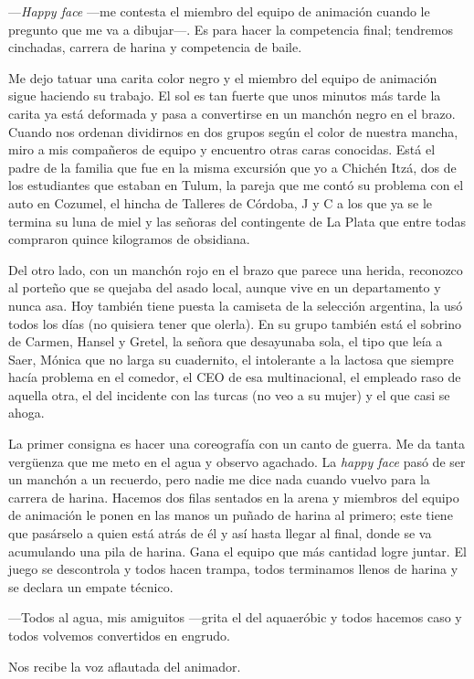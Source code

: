 \documentclass[12pt,twoside,openright,a5paper]{book}
\begin{document}
---\emph{Happy face} ---me contesta el miembro del equipo de animación cuando
le pregunto que me va a dibujar---. Es para hacer la competencia final;
tendremos cinchadas, carrera de harina y competencia de baile.

Me dejo tatuar una carita color negro y el miembro del equipo de animación
sigue haciendo su trabajo. El sol es tan fuerte que unos minutos más tarde
la carita ya está deformada y pasa a convertirse en un manchón negro en el
brazo. Cuando nos ordenan dividirnos en dos grupos según el color de nuestra
mancha, miro a mis compañeros de equipo y encuentro otras caras
conocidas. Está el padre de la familia que fue en la misma excursión que
yo a Chichén Itzá, dos de los estudiantes que estaban en Tulum, la pareja
que me contó su problema con el auto en Cozumel, el hincha de Talleres
de Córdoba, J y C a los que ya se le termina su luna de miel y las señoras
del contingente de La Plata que entre todas compraron quince kilogramos de obsidiana.

Del otro lado, con un manchón rojo en el brazo que parece una herida,
reconozco al porteño que se quejaba del asado local, aunque vive en
un departamento y nunca asa. Hoy también tiene puesta la camiseta de
la selección argentina, la usó todos los días (no quisiera tener que
olerla). En su grupo también está el sobrino de Carmen, Hansel y Gretel,
la señora que desayunaba sola, el tipo que leía a Saer, Mónica que no
larga su cuadernito, el intolerante a la lactosa que siempre hacía problema
en el comedor, el CEO de esa multinacional, el empleado raso de aquella otra,
el del incidente con las turcas (no veo a su mujer) y el que casi se ahoga.

La primer consigna es hacer una coreografía con un canto de guerra. Me da
tanta vergüenza que me meto en el agua y observo agachado. La \emph{happy face} pasó
de ser un manchón a un recuerdo, pero nadie me dice nada cuando vuelvo para
la carrera de harina. Hacemos dos filas sentados en la arena y miembros del
equipo de animación le ponen en las manos un puñado de harina al primero;
este tiene que pasárselo a quien está atrás de él y así hasta llegar
al final, donde se va acumulando una pila de harina. Gana el equipo que
más cantidad logre juntar. El juego se descontrola y todos hacen trampa,
todos terminamos llenos de harina y se declara un empate técnico. 

---Todos
al agua, mis amiguitos ---grita el del aquaeróbic y todos hacemos caso y todos
volvemos convertidos en engrudo.

Nos recibe la voz aflautada del animador.
\end{document}

